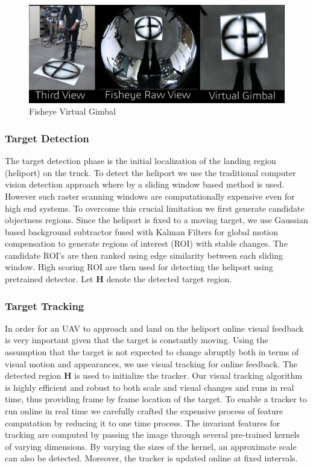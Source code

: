 \documentclass{standalone}
\begin{document}
\begin{figure}[h]
    \begin{center}
      \includegraphics[width=0.9\columnwidth]{sections/task1/images/fisheye_virtual_gimbal.png}
    \end{center}
    \caption{Fisheye Virtual Gimbal}
    \label{figure:fisheye-virtual-gimbal}
\end{figure}

\subsubsection{Target Detection}
The target detection phase is the initial localization of the landing
region (heliport) on the truck. To detect the heliport we use the
traditional computer vision detection approach where by a sliding
window based method is used. However such raster scanning windows are
computationally expensive even for high end systems. To overcome this
crucial limitation we first generate candidate objectness
regions. Since the heliport is fixed to a moving target, we use
Gaussian based background subtractor fused with Kalman Filters for 
global motion compensation to generate regions of interest
(ROI)  with stable changes. The candidate ROI's are then ranked using
edge similarity between each sliding window. High scoring ROI are then
used for detecting the heliport using pretrained detector. 
Let $\mathbf{H}$ denote the detected target region.

\subsubsection{Target Tracking}

In order for an UAV to approach and land on the heliport online visual
feedback is very important given that the target is constantly moving.
Using the assumption that the target is not
expected to change abruptly both in terms of visual motion and
appearances, we use visual tracking for online feedback.
The detected region $\mathbf{H}$ is used to initialize the
tracker. Our visual tracking algorithm is highly efficient and robust
to both scale and visual changes and runs in real time, thus
providing frame by frame location of the target. To enable a tracker
to run online in real time we carefully crafted the expensive process
of feature computation by reducing it to one time process. 
The invariant features for tracking are computed by passing the image
through several pre-trained kernels of varying dimensions. By varying
the sizes of the kernel, an approximate scale can also be detected.
Moreover, the tracker is updated online at fixed intervals.
\end{document}
